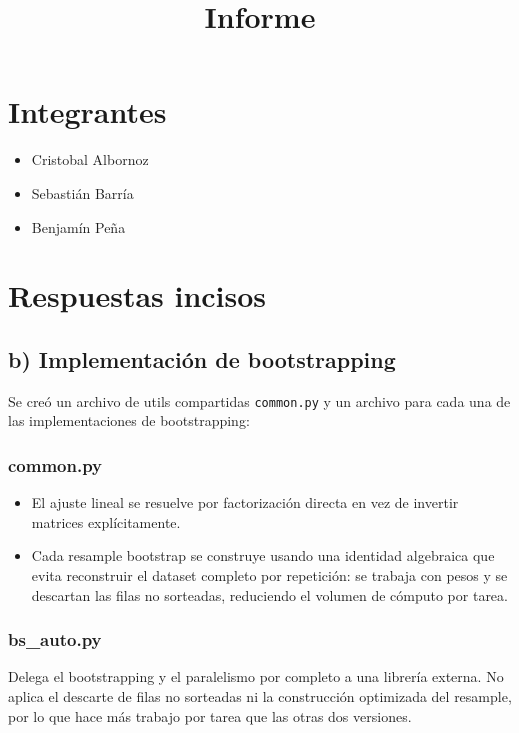 \documentclass[11pt]{article}
\title{Informe}
\author{}
\date{}
\begin{document}
\maketitle

\section*{Integrantes}
\begin{itemize}
  \item Cristobal Albornoz
  \item Sebasti\'an Barr\'ia
  \item Benjam\'in Pe\~na
\end{itemize}

\section*{Respuestas incisos}

\subsection*{b) Implementaci\'on de bootstrapping}

Se cre\'o un archivo de utils compartidas \texttt{common.py} y un archivo para cada una de las implementaciones de bootstrapping:

\subsubsection*{common.py}

\begin{itemize}
  \item El ajuste lineal se resuelve por factorizaci\'on directa en vez de invertir matrices expl\'icitamente.
  \item Cada resample bootstrap se construye usando una identidad algebraica que evita reconstruir el dataset completo por repetici\'on: se trabaja con pesos y se descartan las filas no sorteadas, reduciendo el volumen de c\'omputo por tarea.
\end{itemize}

\subsubsection*{bs\_auto.py}

Delega el bootstrapping y el paralelismo por completo a una librer\'ia externa. No aplica el descarte de filas no sorteadas ni la construcci\'on optimizada del resample, por lo que hace m\'as trabajo por tarea que las otras dos versiones.
\end{document}
